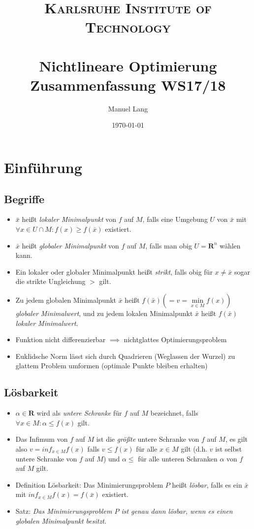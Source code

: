 \documentclass[paper=a4, fontsize=11pt]{scrartcl} %
\title{
\normalfont \normalsize
\textsc{Karlsruhe Institute of Technology} \\ [25pt] %
\horrule{0.5pt} \\[0.4cm] %
\huge Nichtlineare Optimierung\\ Zusammenfassung WS17/18 %
\horrule{2pt} \\[0.5cm] %
}
\author{Manuel Lang} %
\date{\normalsize\today} %
\numberwithin{equation}{section} %
\numberwithin{figure}{section} %
\numberwithin{table}{section} %
\begin{document}
\maketitle %

\section{Einführung}

\subsection{Begriffe}

\begin{itemize}
\item $\bar{x}$ heißt \textit{lokaler Minimalpunkt} von $f$ auf $M$, falls eine Umgebung $U$ von $\bar{x}$ mit $\forall x \in U \cap M: f(x) \ge f(\bar{x})$ existiert.
\item $\bar{x}$ heißt \textit{globaler Minimalpunkt} von $f$ auf $M$, falls man obig $U = \mathbf{R}^n$ wählen kann.
\item Ein lokaler oder globaler Minimalpunkt heißt \textit{strikt}, falls obig für $x \neq \bar{x}$ sogar die strikte Ungleichung $>$ gilt.
\item Zu jedem globalen Minimalpunkt $\bar{x}$ heißt $f(\bar{x}) (=v= \min\limits_{x \in M} f(x))$ \textit{globaler Minimalwert}, und zu jedem lokalen Minimalpunkt $\bar{x}$ heißt $f(\bar{x})$ \textit{lokaler Minimalwert}.
\item Funktion nicht differenzierbar $\implies$ nichtglattes Optimierungsproblem
\item Euklidsche Norm lässt sich durch Quadrieren (Weglassen der Wurzel) zu glattem Problem umformen (optimale Punkte bleiben erhalten)
\end{itemize}

\subsection{Lösbarkeit}

\begin{itemize}
\item $\alpha \in \mathbf{R}$ wird als \textit{untere Schranke} für $f$ auf $M$ bezeichnet, falls $\forall x \in M: \alpha \le f(x)$ gilt.
\item Das Infimum von $f$ auf $M$ ist die \textit{größte} untere Schranke von $f$ auf $M$, es gilt also $v = inf_{x \in M} f(x)$ falls $v \le f(x)$ für alle $x \in M$ gilt (d.h. $v$ ist selbst untere Schranke von $f$ auf $M$) und $\alpha \le$ für alle unteren Schranken $\alpha$ von $f$ auf $M$ gilt.
\item Definition Lösbarkeit: Das Minimierungsproblem $P$ heißt \textit{lösbar}, falls es ein $\bar{x}$ mit $inf_{x \in M} f(x) = f(\bar{x})$ existiert.
\item Satz: \textit{Das Minimierungsproblem $P$ ist genau dann lösbar, wenn es einen globalen Minimalpunkt besitzt.}
\end{itemize}
\end{document}
